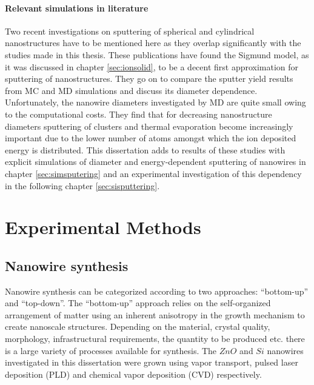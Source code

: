 \subsubsection{Relevant simulations in literature}

Two recent investigations on sputtering of spherical \cite{nietiadi_sputtering_2014} and cylindrical \cite{urbassek_sputter_2015} nanostructures have to be mentioned here as they overlap significantly with the studies made in this thesis. These publications have found the Sigmund model, as it was discussed in chapter \ref{sec:ionsolid}, to be a decent first approximation for sputtering of nanostructures. They go on to compare the sputter yield results from MC and MD simulations and discuss its diameter dependence. Unfortunately, the nanowire diameters investigated by MD are quite small owing to the computational costs. They find that for decreasing nanostructure diameters sputtering of clusters and thermal evaporation become increasingly important due to the lower number of atoms amongst which the ion deposited energy is distributed. This dissertation adds to results of these studies with explicit simulations of diameter and energy-dependent sputtering of nanowires in chapter \ref{sec:simsputering} and an experimental investigation of this dependency in the following chapter \ref{sec:sisputtering}.


\chapter{Experimental Methods}

\section{Nanowire synthesis}

Nanowire synthesis can be categorized according to two approaches: ``bottom-up'' and ``top-down''. The ``bottom-up'' approach relies on the self-organized arrangement of matter using an inherent anisotropy in the growth mechanism to create nanoscale structures. Depending on the material, crystal quality, morphology, infrastructural requirements, the quantity to be produced etc. there is a large variety of processes available for synthesis. The $ZnO$ \cite{borchers_catalyst_2006, stichtenoth_dimensionseffekte_2008, muller_structural_2009,cao_tuning_2010,ogrisek_kontrolliertes_2013} and $Si$ \cite{lugstein_pressure-induced_2008} nanowires investigated in this dissertation were grown using vapor transport, pulsed laser deposition (PLD) and chemical vapor deposition (CVD) respectively. 

